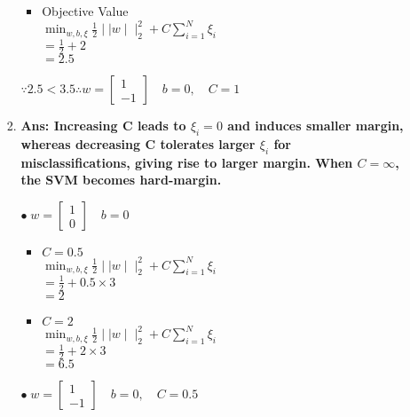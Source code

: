 \documentclass{article}
\theoremstyle{definition}
\theoremstyle{remark}
\begin{document}
\begin{enumerate}[font={\Large\bfseries},left=0pt]
\begin{tcolorbox}
\begin{enumerate}
\begin{enumerate}
\begin{itemize}
					            \item Objective Value \\
					                  $\min_{w, b, \xi} \frac{1}{2} \mid\mid w \mid\mid^2_2 + C \sum^N_{i = 1} \xi_i$ \\
					                  $= \frac{1}{2} + 2$ \\
					                  $= 2.5$
				            \end{itemize}
				            $\because 2.5 < 3.5 \therefore w = \begin{bmatrix} 1 \\ -1\end{bmatrix} \quad b = 0, \quad C = 1$
				      \item \textbf{Ans: Increasing C leads to $\xi_i = 0$ and induces smaller margin, whereas decreasing C tolerates larger $\xi_i$ for misclassifications, giving rise to larger margin. When $C = \infty$, the SVM becomes hard-margin.}
				            \begin{multicols}{2}
					            $\bullet \; w = \begin{bmatrix} 1 \\ 0\end{bmatrix} \quad b = 0$
					            \begin{itemize}
						            \item $C = 0.5$ \\
						                  $\min_{w, b, \xi} \frac{1}{2} \mid\mid w \mid\mid^2_2 + C \sum^N_{i = 1} \xi_i$ \\
						                  $= \frac{1}{2} + 0.5 \times 3$ \\
						                  $= 2$
						            \item $C = 2$ \\
						                  $\min_{w, b, \xi} \frac{1}{2} \mid\mid w \mid\mid^2_2 + C \sum^N_{i = 1} \xi_i$ \\
						                  $= \frac{1}{2} + 2 \times 3$ \\
						                  $= 6.5$
					            \end{itemize}

					            \columnbreak
					            $\bullet \; w = \begin{bmatrix} 1 \\ -1\end{bmatrix} \quad b = 0, \quad C = 0.5$


\end{multicols}
\end{enumerate}
\end{enumerate}
\end{tcolorbox}
\end{enumerate}
\end{document}

